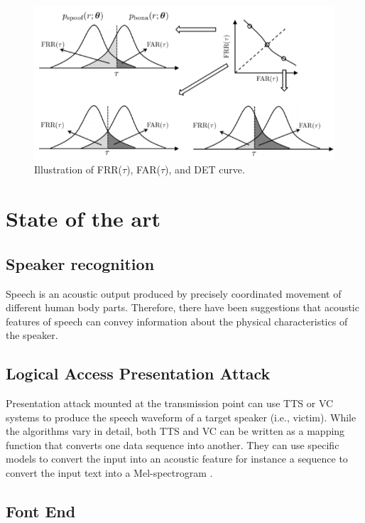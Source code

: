 \begin{figure}
    \centering
    \includegraphics{figures/eer.png}
    \caption{ Illustration of FRR($\tau$), FAR($\tau$), and DET curve.}
    \label{fig:error}
\end{figure}



\section{State of the art}

\subsection{Speaker recognition}
Speech is an acoustic output produced by precisely coordinated movement of different human body parts. Therefore, there have been suggestions that acoustic features of speech can convey information about the physical characteristics of the speaker\cite{gupta2022estimation}.

\subsection{Logical Access Presentation Attack}

Presentation attack mounted at the transmission point can use \ac{TTS} or \ac{VC} systems to produce the speech waveform of a target speaker (i.e., victim). While the algorithms vary in detail, both \acs{TTS} and \acs{VC} can be written as a mapping function that converts one data sequence into another\cite{wang2022practical}. They can use specific models to convert the input into an acoustic feature for instance a sequence to convert the input text into a Mel-spectrogram \cite{shen2018natural}.

\subsection{Font End}

